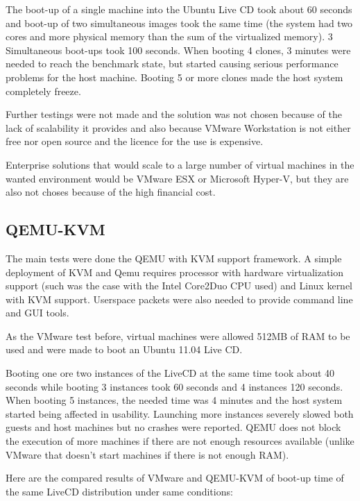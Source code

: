 The boot-up of a single machine into the Ubuntu Live CD took about 60
seconds and boot-up of two simultaneous images took the same time (the
system had two cores and more physical memory than the sum of the
virtualized memory). 3 Simultaneous boot-ups took 100 seconds. When booting
4 clones, 3 minutes were needed to reach the benchmark state, but started
causing serious performance problems for the host machine. Booting 5 or
more clones made the host system completely freeze.

Further testings were not made and the solution was not chosen because of
the lack of scalability it provides and also because VMware Workstation is
not either free nor open source and the licence for the use is expensive.

Enterprise solutions that would scale to a large number of virtual machines
in the wanted environment would be VMware ESX or Microsoft Hyper-V, but
they are also not choses because of the high financial cost.

\subsection{QEMU-KVM}


The main tests were done the QEMU with KVM support framework. A simple
deployment of KVM and Qemu requires processor with hardware virtualization
support (such was the case with the Intel Core2Duo CPU used) and  Linux
kernel with KVM support. Userspace packets were also needed to provide
command line and GUI tools.

As the VMware test before, virtual machines were allowed 512MB of RAM to be
used and were made to boot an Ubuntu 11.04 Live CD.

Booting one ore two instances of the LiveCD at the same time took about 40
seconds while booting 3 instances took 60 seconds and 4 instances 120
seconds. When booting 5 instances, the needed time was 4 minutes and the
host system started being affected in usability. Launching more instances
severely slowed both guests and host machines but no crashes were reported.
QEMU does not block the execution of more machines if there are not enough
resources available (unlike VMware that doesn't start machines if there is
not enough RAM).

Here are the compared results of VMware and QEMU-KVM  of boot-up time of
the same LiveCD distribution under same conditions:


